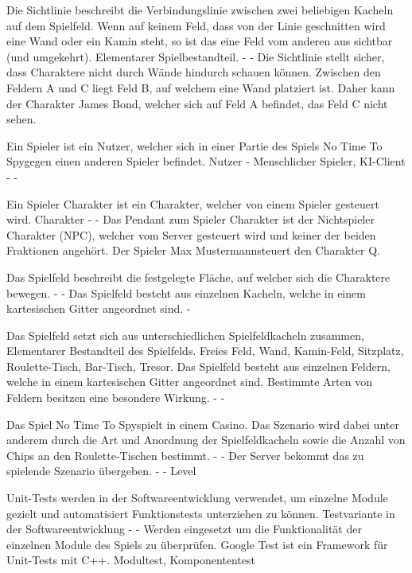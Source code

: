 {Die Sichtlinie beschreibt die Verbindungslinie zwischen zwei beliebigen Kacheln auf dem Spielfeld. Wenn auf keinem Feld, dass von der Linie geschnitten wird eine Wand oder ein Kamin steht, so ist das eine Feld vom anderen aus sichtbar (und umgekehrt).}
{Elementarer Spielbestandteil.}
{-}
{-}
{Die Sichtlinie stellt sicher, dass Charaktere nicht durch Wände hindurch schauen können.}
{Zwischen den Feldern A und C liegt Feld B, auf welchem eine Wand platziert ist. Daher kann der Charakter \glqq James Bond\grqq, welcher sich auf Feld A befindet, das Feld C nicht sehen.}

{Ein Spieler ist ein Nutzer, welcher sich in einer Partie des Spiels \glqq No Time To Spy\grqq gegen einen anderen Spieler befindet.}
{Nutzer}
{-}
{Menschlicher Spieler, KI-Client}
{-}
{-}

{Ein Spieler Charakter ist ein Charakter, welcher von einem Spieler gesteuert wird.}
{Charakter}
{-}
{-}
{Das Pendant zum Spieler Charakter ist der Nichtspieler Charakter (NPC), welcher vom Server gesteuert wird und keiner der beiden Fraktionen angehört.}
{Der Spieler \glqq Max Mustermann\grqq steuert den Charakter \glqq Q\grqq.}

{Das Spielfeld beschreibt die festgelegte Fläche, auf welcher sich die Charaktere bewegen.}
{-}
{-}
{Das Spielfeld besteht aus einzelnen Kacheln, welche in einem kartesischen Gitter angeordnet sind.}
{-}

{Das Spielfeld setzt sich aus unterschiedlichen Spielfeldkacheln zusammen, }
{Elementarer Bestandteil des Spielfelds.}
{Freies Feld, Wand, Kamin-Feld, Sitzplatz, Roulette-Tisch, Bar-Tisch, Tresor.}
{Das Spielfeld besteht aus einzelnen Feldern, welche in einem kartesischen Gitter angeordnet sind.}
{Bestimmte Arten von Feldern besitzen eine besondere Wirkung.}
{-}
{-}

{Das Spiel \glqq No Time To Spy\grqq spielt in einem Casino. Das Szenario wird dabei unter anderem durch die Art und Anordnung der Spielfeldkacheln sowie die Anzahl von Chips an den Roulette-Tischen bestimmt. }
{-}
{-}
{Der Server bekommt das zu spielende Szenario übergeben.}
{-}
{-}
{Level}

{Unit-Tests werden in der Softwareentwicklung verwendet, um einzelne Module gezielt und automatisiert Funktionstests unterziehen zu können.}
{Testvariante in der Softwareentwicklung}
{-}
{-}
{Werden eingesetzt um die Funktionalität der einzelnen Module des Spiels zu überprüfen.}
{Google Test ist ein Framework für Unit-Tests mit C++.}
{Modultest, Komponententest}

